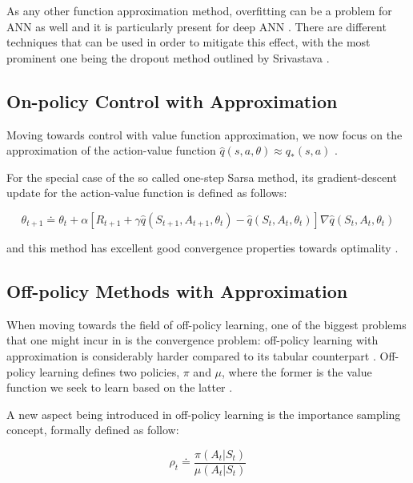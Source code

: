 \documentclass{seal_thesis}
\begin{document}
As any other function approximation method, overfitting can be a problem for ANN as well and it is particularly present for deep ANN \cite[p. 218]{Sutton2017}. There are different techniques that can be used in order to mitigate this effect, with the most prominent one being the dropout method outlined by Srivastava \cite{Srivastava2014}.

\subsection{On-policy Control with Approximation}
\label{subsec:onpol_control}

Moving towards control with value function approximation, we now focus on the approximation of the action-value function $\hat{q} (s,a,\theta) \approx q_* (s,a)$ \cite[p. 229]{Sutton2017}.

For the special case of the so called one-step Sarsa method, its gradient-descent update for the action-value function is defined as follows:

\begin{equation}
	\theta_{t+1} \doteq \theta_t + \alpha [ R_{t+1} + \gamma \hat{q} (S_{t+1}, A_{t+1}, \theta_t) - \hat{q} (S_t, A_t, \theta_t) ] \nabla \hat{q} (S_t, A_t, \theta_t)
\end{equation}

and this method has excellent good convergence properties towards optimality \cite[p. 230]{Sutton2017}.

\subsection{Off-policy Methods with Approximation}
\label{subsec:offpol_methods}

When moving towards the field of off-policy learning, one of the biggest problems that one might incur in is the convergence problem: off-policy learning with approximation is considerably harder compared to its tabular counterpart \cite[p. 243]{Sutton2017}. Off-policy learning defines two policies, $\pi$ and $\mu$, where the former is the value function we seek to learn based on the latter \cite[p. 243]{Sutton2017}.

A new aspect being introduced in off-policy learning is the importance sampling concept, formally defined as follow:

\begin{equation}
\label{eq:importance_sampling}
	\rho_t \doteq \frac{\pi(A_t|S_t)}{\mu(A_t|S_t)}
\end{equation}
\end{document}
